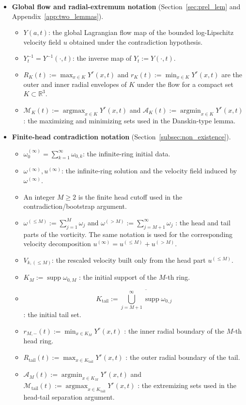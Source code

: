 \documentclass[reqno,11pt]{amsart}
\begin{document}
\begin{itemize}
\item \textbf{Global flow and radial-extremum notation}
(Section~\ref{sec:prel_lem} and Appendix~\ref{app:two_lemmas}).
\begin{itemize}
    \item $Y(a,t)$: the global Lagrangian flow map of the bounded log-Lipschitz velocity field $u$ obtained under the contradiction hypothesis.
    \item $Y_t^{-1}=Y^{-1}(\cdot,t)$: the inverse map of $Y_t:=Y(\cdot,t)$.
    \item $R_K(t):=\max_{x\in K}Y^r(x,t)$ and $r_K(t):=\min_{x\in K}Y^r(x,t)$
    are the outer and inner radial envelopes of $K$ under the flow for a compact set $K\subset \mathbb R^3$.
    \item $\mathcal M_K(t):=\operatorname*{argmax}_{x\in K}Y^r(x,t)$
    and $\mathcal A_K(t):=\operatorname*{argmin}_{x\in K}Y^r(x,t)$
    : the maximizing and minimizing sets used in the Danskin-type lemma.
\end{itemize}


\item \textbf{Finite-head contradiction notation}
(Section~\ref{subsec:non_existence}).
\begin{itemize}
    \item $\omega_0^{(\infty)}=\sum_{k=1}^\infty \omega_{0,k}$: the infinite-ring initial data.
    \item
    $\omega^{(\infty)}, u^{(\infty)}$: the infinite-ring solution and the velocity field induced by $\omega^{(\infty)}.$
    \item
    An integer $M\geq 2$ is the finite head cutoff used in the contradiction/bootstrap argument.
    \item $
        \omega^{(\le M)}:=\sum_{j=1}^M \omega_j$ and $\omega^{(>M)}:=\sum_{j=M+1}^\infty \omega_j$
    : the head and tail parts of the vorticity. The same notation is used for the corresponding velocity decomposition $u^{(\infty)}=u^{(\le M)}+u^{(>M)}.$
    \item $V_{k,(\le M)}$: the rescaled velocity built only from the head part $u^{(\le M)}$.
    \item $K_M:=\operatorname{supp}\omega_{0,M}$
    : the initial support of the $M$-th ring.
    \item
    \[
        K_{\mathrm{tail}}:=\overline{\bigcup_{j=M+1}^\infty \operatorname{supp}\omega_{0,j}}
    \]
    : the initial tail set.
    \item $
        r_{M,-}(t):=\min_{x\in K_M}Y^r(x,t)$
    : the inner radial boundary of the $M$-th head ring.
    \item$
        R_{\mathrm{tail}}(t):=\max_{x\in K_{\mathrm{tail}}}Y^r(x,t)$
    : the outer radial boundary of the tail.
    \item $\mathcal A_M(t):=\operatorname*{argmin}_{x\in K_M}Y^r(x,t)$ and $
        \mathcal M_{\mathrm{tail}}(t):=\operatorname*{argmax}_{x\in K_{\mathrm{tail}}}Y^r(x,t)$
    : the extremizing sets used in the head-tail separation argument.
\end{itemize}
\end{itemize}
\end{document}
